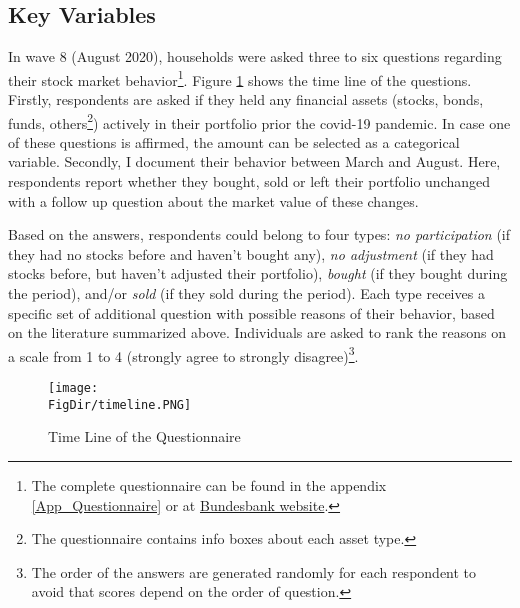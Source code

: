 \documentclass[ProjectABM]{subfiles}
\begin{document}
\subsection{Key Variables}
In wave 8 (August 2020), households were asked three to six questions regarding their stock market behavior\footnote{The complete questionnaire can be found in the appendix \ref{App_Questionnaire} or at \href{https://www.bundesbank.de/en/bundesbank/research/survey-on-consumer-expectations/questionnaires-850746}{Bundesbank website}.}. Figure \ref{fig:timeline} shows the time line of the questions. Firstly, respondents are asked if they held any financial assets (stocks, bonds, funds, others\footnote{The questionnaire contains info boxes about each asset type.}) actively in their portfolio prior the covid-19 pandemic. In case one of these questions is affirmed, the amount can be selected as a categorical variable. Secondly, I document their behavior between March and August. Here, respondents report whether they bought, sold or left their portfolio unchanged with a follow up question about the market value of these changes. %

Based on the answers, respondents could belong to four types: \textit{no participation} (if they had no stocks before and haven't bought any), \textit{no adjustment} (if they had stocks before, but haven't adjusted their portfolio), \textit{bought} (if they bought during the period), and/or \textit{sold} (if they sold during the period). Each type receives a specific set of additional question with possible reasons of their behavior, based on the literature summarized above. Individuals are asked to rank the reasons on a scale from 1 to 4 (strongly agree to strongly disagree)\footnote{ The order of the answers are generated randomly for each respondent to avoid that scores depend on the order of question.}.


\begin{figure}
	\centering
	\texttt{[image: \\FigDir/timeline.PNG]}
	\caption{Time Line of the Questionnaire}
	\label{fig:timeline}
\end{figure}
\end{document}
